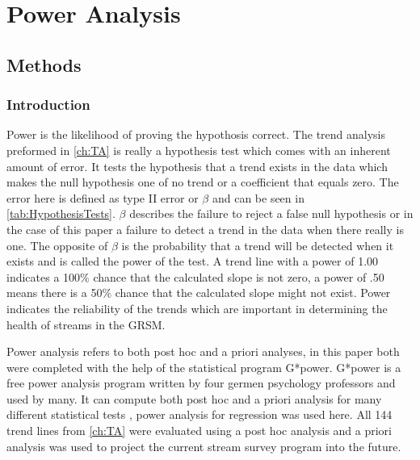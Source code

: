 \chapter{Power Analysis} \label{ch:poweranslysis}

\section{Methods}

\subsection{Introduction}
Power is the likelihood of proving the hypothosis correct.
The trend analysis  preformed in \autoref{ch:TA} is really a hypothesis test which comes with an inherent amount of error.  
It tests the hypothesis that a trend exists in the data which makes the null hypothesis one of no trend or a coefficient that equals zero.
The error here is defined as type II error or $\beta$ and can be seen in \autoref{tab:HypothesisTests}.
$\beta$ describes the failure to reject a false null hypothesis or in the case of this paper a failure to detect a trend in the data when there really is one.
The opposite of $\beta$ is the probability that a trend will be detected when it exists and is called the power of the test.
A trend line with a power of 1.00 indicates a 100$\%$ chance that the calculated slope is not zero, a power of .50 means there is a 50$\%$ chance that the calculated slope might not exist.
Power indicates the reliability of the trends which are important in determining the health of streams in the GRSM.



Power analysis refers to both  post hoc and a priori analyses, in this paper both were completed with the help of the statistical program G*power.
G*power is a free power analysis program written by four germen psychology professors and used by many.
It can compute both post hoc and a priori analysis for many different statistical tests \citep{faul2009statistical}, power analysis for regression was used here.
All 144 trend lines from \autoref{ch:TA} were evaluated using a post hoc analysis and a priori analysis was used to project the current stream survey program into the future.

